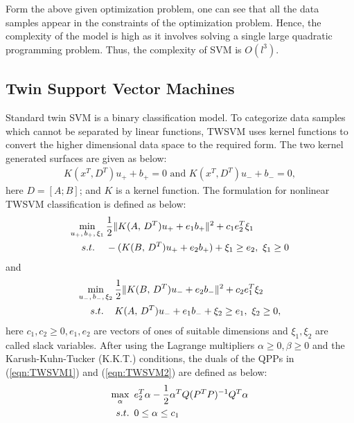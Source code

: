 \documentclass[pdflatex,sn-mathphys]{sn-jnl}%
\theoremstyle{thmstyleone}%
\theoremstyle{thmstyletwo}%
\theoremstyle{thmstylethree}%
\begin{document}
Form the above given optimization problem, one can see that all the data samples appear in the constraints of the optimization problem. Hence, the complexity of the model is high as it involves solving a single large quadratic programming problem. Thus, the complexity of SVM is $O(l^3)$.


\subsection{Twin Support Vector Machines \cite{khemchandani2007twin}}
 Standard twin SVM is a binary classification model. To categorize data samples which cannot be separated by linear functions, TWSVM uses kernel functions to convert the higher dimensional data space to the required form. The two kernel generated surfaces are given as below:
\begin{align}
K(x^T,D^T)u_++b_+=0\,\,\mbox{and}\,\,K(x^T,D^T)u_-+b_-=0,
\end{align}
here $D=[A;B]$;  and $K$ is a kernel function. The formulation for nonlinear TWSVM classification is defined as below:
\begin{align}
\label{eqn:TWSVM1}
\min_{u_+,\,b_+,\,\xi_1}\hspace{.2em} &\frac{1}{2}\|K(A,\,D^T)u_++e_1b_+\|^2+{c_1}e_2^T\xi_1 \notag\\
s.t.\hspace{.4cm}  &-(K(B,\,D^T)u_++e_2b_+)+\xi_1\ge e_2,\,\,\xi_1\ge0
\end{align}
and 
\begin{align}
\label{eqn:TWSVM2}
\min_{u_-,\,b_-,\,\xi_2}\hspace{.2em} &\frac{1}{2}\|K(B,\,D^T)u_-+e_2b_-\|^2+{c_2}e_1^T\xi_2 \notag\\
s.t.\hspace{.4cm}&K(A,\,D^T)u_-+e_1b_-+\xi_2\ge e_1,\,\,\xi_2\ge0,
\end{align}
here $c_1, c_2 \geq 0, e_1, e_2$ are vectors of ones of suitable dimensions and $\xi_1, \xi_2$ are called slack variables. After using the Lagrange multipliers $\alpha\ge0, \beta\ge0$ and the Karush-Kuhn-Tucker (K.K.T.) \cite{kuhn} conditions, the duals of the QPPs in (\ref{eqn:TWSVM1}) and (\ref{eqn:TWSVM2}) are defined as below:
\begin{align}
\label{eqn:DTWSVM1}
\max_{\alpha}\hspace{.5em}& e_2^T\alpha-\frac{1}{2}\alpha^TQ(P^TP)^{-1}Q^T\alpha \notag\\
s.t.\hspace{.5em}&0\leq \alpha \leq c_1
\end{align}
\end{document}
